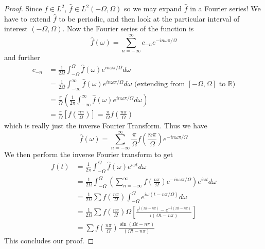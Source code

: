 \begin{proof}
Since $f\in L^2$, $\widehat{f}\in L^2(-\Omega,\Omega)$ so we
may expand $\widehat{f}$ in a Fourier series! We have to
extend $\widehat{f}$ to be periodic, and then look at the
particular interval of interest $(-\Omega,\Omega)$. Now the
Fourier series of the function is
\begin{equation}
\widehat{f}(\omega) = \sum^{\infty}_{n=-\infty}c_{-n}e^{-in\omega\pi/\Omega}
\end{equation}
and further
\begin{subequations}
\begin{align}
c_{-n} &= \frac{1}{2\Omega}\int^{\Omega}_{-\Omega}\widehat{f}(\omega)e^{in\omega\pi/\Omega}d\omega\\
&=
\frac{1}{2\Omega}\int^{\infty}_{-\infty}\widehat{f}(\omega)e^{in\omega\pi/\Omega}d\omega\text{  (extending from $[-\Omega,\Omega]$ to $\mathbb{R}$)}\\
&= \frac{\pi}{\Omega}\left(\frac{1}{2\pi}\int^{\infty}_{-\infty}\widehat{f}(\omega)e^{in\omega\pi/\Omega}d\omega\right)\\
&=\frac{\pi}{\Omega}\left[f\left(\frac{n\pi}{\Omega}\right)\right]
= \frac{\pi}{\Omega}f\left(\frac{n\pi}{\Omega}\right)
\end{align}
\end{subequations}
which is really just the inverse Fourier Transform. Thus we have
\begin{equation}
\widehat{f}(\omega) = \sum^{\infty}_{n=-\infty}\frac{\pi}{\Omega}f\left(\frac{n\pi}{\Omega}\right)e^{-in\omega\pi/\Omega}
\end{equation}
We then perform the inverse Fourier transform to get
\begin{subequations}
\begin{align}
f(t) &=
\frac{1}{2\pi}\int^{\Omega}_{-\Omega}\widehat{f}(\omega)e^{i\omega t}d\omega\\
&=\frac{1}{2\Omega}\int^{\Omega}_{-\Omega}\left(\sum^{\infty}_{n=-\infty}f\left(\frac{n\pi}{\Omega}\right)e^{-in\omega\pi/\Omega}\right)e^{i\omega t}d\omega\\
&=\frac{1}{2\Omega}\sum f\left(\frac{n\pi}{\Omega}\right)\int^{\Omega}_{-\Omega}e^{i\omega(t-n\pi/\Omega)}d\omega\\
&=\frac{1}{2\Omega}\sum f\left(\frac{n\pi}{\Omega}\right)
\Omega\left[
\frac{e^{i(\Omega t-n\pi)}-e^{-i(\Omega t-n\pi)}}{i(\Omega t-n\pi)}
\right]\\
&=\sum f\left(\frac{n\pi}{\Omega}\right)\frac{\sin(\Omega t-n\pi)}{(\Omega t-n\pi)}
\end{align}
\end{subequations}
This concludes our proof.
\end{proof}
